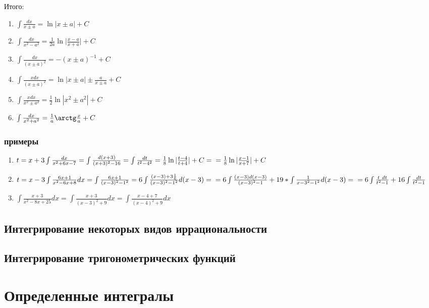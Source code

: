 \documentclass[12pt,a4paper]{article}
\begin{document}
Итого:
\begin{enumerate}[leftmargin=*, itemsep=0.4ex, before={\everymath{\displaystyle}}]%
\item{
$
\int \frac{dx}{x \pm a} =
\ln |x \pm a| + C
$
}
\item{
$
\int \frac{dx}{x^2 - a^2} =
\frac{1}{2a} \ln \big| \frac{x - a}{x + a} \big| + C
$
}
\item{
$
\int \frac{dx}{(x \pm a)^2} =
-(x \pm a)^{-1} + C
$
}
\item{
$
\int \frac{xdx}{(x \pm a)^2} =
\ln |x \pm a| \pm \frac{a}{x \pm a} + C
$
}
\item{
$
\int \frac{xdx}{x^2 \pm a^2} =
\frac{1}{2} \ln |x^2 \pm a^2| + C
$
}
\item{
$
\int \frac{dx}{x^2 + a^2} =
\frac{1}{a} \arctg \frac{x}{a} + C
$
}
\end{enumerate}
\subsubsection{примеры}
\begin{enumerate}[leftmargin=*, itemsep=0.9ex, before={\everymath{\displaystyle}}]%
\item{
$
t = x + 3\\
\int \frac{dx}{x^2 + 6x - 7} =
\int \frac{d(x + 3)}{(x + 3)^2 - 16} =
\int \frac{dt}{t^2 - 4^2} =
\frac{1}{8} \ln |\frac{t - 4}{t + 4}| + C =\\
= \frac{1}{8} \ln |\frac{x - 1}{x + 7}| + C\\
$
}
\item{
$
t = x - 3\\
\int \frac{6x + 1}{x^2 - 6x + 8} dx =
\int \frac{6x + 1}{(x - 3)^2 - 1^2} =
6\int \frac{(x - 3) + 3\frac{1}{6}}{(x - 3)^2 - 1^2} d(x - 3) =\\
= 6\int \frac{(x - 3)d(x - 3)}{(x - 3)^2 - 1} + 19 *
\int \frac{1}{x - 3^2 - 1^2}d(x - 3) =\\
= 6 \int \frac{t\ dt}{t^2 - 1} + 16 \int \frac{dt}{t^2 - 1}
$
}
\item{
$
\int \frac{x + 3}{x^2 - 8x + 25} dx =
\int \frac{x + 3}{(x - 3)^2 + 9} dx =
\int \frac{x - 4 + 7}{(x - 4)^2 + 9} dx
$
}
\end{enumerate}
\subsection{Интегрирование некоторых видов иррациональности}
\subsection{Интегрирование тригонометрических функций}
\section{Определенные интегралы}
\end{document}
